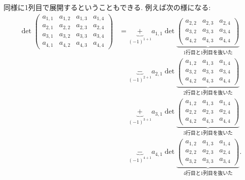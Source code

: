 同様に1列目で展開するということもできる.  例えば次の様になる:
\begin{align*}
  \det
  \begin{pmatrix}
    a_{1,1} & a_{1,2} & a_{1,3} & a_{1,4}\\
    a_{2,1} & a_{2,2} & a_{2,3} & a_{2,4}\\
    a_{3,1} & a_{3,2} & a_{3,3} & a_{3,4}\\
    a_{4,1} & a_{4,2} & a_{4,3} & a_{4,4}
  \end{pmatrix}
  &=
    \underbrace{+}_{(-1)^{1+1}} a_{1,1}
  \det
  \underbrace{
  \begin{pmatrix}
    a_{2,2} & a_{2,3} & a_{2,4}\\
    a_{3,2} & a_{3,3} & a_{3,4}\\
    a_{4,2} & a_{4,3} & a_{4,4}
  \end{pmatrix}
  }_{\text{1行目と1列目を抜いた}}
  \\
  &\phantom{{}={}}
    \underbrace{-}_{(-1)^{2+1}} a_{2,1}
  \det
  \underbrace{
  \begin{pmatrix}
    a_{1,2} & a_{1,3} & a_{1,4}\\
    a_{3,2} & a_{3,3} & a_{3,4}\\
    a_{4,2} & a_{4,3} & a_{4,4}
  \end{pmatrix}
  }_{\text{2行目と1列目を抜いた}}
  \\
  &\phantom{{}={}}
    \underbrace{+}_{(-1)^{3+1}} a_{3,1}
  \det
  \underbrace{
  \begin{pmatrix}
    a_{1,2} & a_{1,3} & a_{1,4}\\
    a_{2,2} & a_{2,3} & a_{2,4}\\
    a_{4,2} & a_{4,3} & a_{4,4}
  \end{pmatrix}
  }_{\text{3行目と1列目を抜いた}}
  \\
  &\phantom{{}={}}
    \underbrace{-}_{(-1)^{4+1}} a_{4,1}
  \det
  \underbrace{
  \begin{pmatrix}
    a_{1,2} & a_{1,3} & a_{1,4}\\
    a_{2,2} & a_{2,3} & a_{2,4}\\
    a_{3,2} & a_{3,3} & a_{3,4}
  \end{pmatrix}
  }_{\text{4行目と1列目を抜いた}}.
\end{align*}

